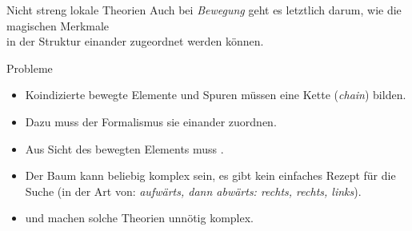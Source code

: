 \begin{frame}
  {Nicht streng lokale Theorien}
  \onslide<+->
  \onslide<+->
  Auch bei \textit{Bewegung} geht es letztlich darum, wie die magischen Merkmale\\
  in der Struktur einander zugeordnet werden können.\\
  \onslide<+->
  \Zeile
  \begin{minipage}{0.35\textwidth}
    \centering 
  \end{minipage}\hspace{1em}\begin{minipage}{0.6\textwidth}
    Probleme\\
    \Halbzeile
    \begin{itemize}[<+->]\small
      \item Koindizierte bewegte Elemente und Spuren müssen eine Kette (\textit{chain}) bilden.
      \item Dazu muss der Formalismus sie einander zuordnen.
      \item Aus Sicht des bewegten Elements muss .
      \item Der Baum kann beliebig komplex sein, es gibt kein einfaches Rezept für die Suche (in der Art von: \textit{aufwärts, dann abwärts: rechts, rechts, links}).
      \item {} und  machen solche Theorien unnötig komplex.
    \end{itemize}
  \end{minipage}
\end{frame}

